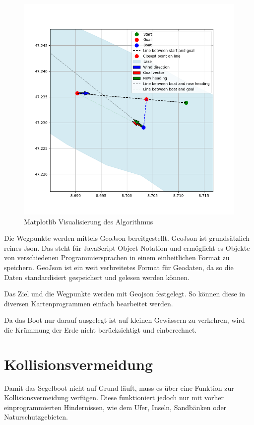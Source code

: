 \begin{figure}[H]
    \centering
    \includegraphics[width=1\linewidth]{assets/3.png}
    \caption{Matplotlib Visualisierung des Algorithmus}
    
\end{figure}

Die Wegpunkte werden mittels GeoJson bereitgestellt. GeoJson ist grundsätzlich reines Json. Das steht für JavaScript Object Notation und ermöglicht es Objekte von verschiedenen Programmiersprachen in einem einheitlichen Format zu speichern. GeoJson ist ein weit verbreitetes Format für Geodaten, da so die Daten standardisiert gespeichert und gelesen werden können.

Das Ziel und die Wegpunkte werden mit Geojson festgelegt. So können diese in diversen Kartenprogrammen einfach bearbeitet werden.

Da das Boot nur darauf ausgelegt ist auf kleinen Gewässern zu verkehren, wird die Krümmung der Erde nicht berücksichtigt und einberechnet.
\section{Kollisionsvermeidung}
Damit das Segelboot nicht auf Grund läuft, muss es über eine Funktion zur Kollisionsvermeidung verfügen. Diese funktioniert jedoch nur mit vorher einprogrammierten Hindernissen, wie dem Ufer, Inseln, Sandbänken oder Naturschutzgebieten. 


